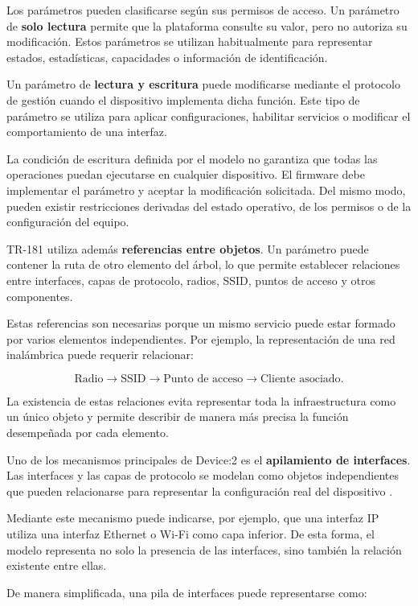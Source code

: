 Los parámetros pueden clasificarse según sus permisos de acceso. Un
parámetro de \textbf{solo lectura} permite que la plataforma consulte su
valor, pero no autoriza su modificación. Estos parámetros se utilizan
habitualmente para representar estados, estadísticas, capacidades o
información de identificación.

Un parámetro de \textbf{lectura y escritura} puede modificarse mediante
el protocolo de gestión cuando el dispositivo implementa dicha función.
Este tipo de parámetro se utiliza para aplicar configuraciones, habilitar
servicios o modificar el comportamiento de una interfaz.

La condición de escritura definida por el modelo no garantiza que todas
las operaciones puedan ejecutarse en cualquier dispositivo. El firmware
debe implementar el parámetro y aceptar la modificación solicitada. Del
mismo modo, pueden existir restricciones derivadas del estado operativo,
de los permisos o de la configuración del equipo.

TR-181 utiliza además
\textbf{referencias entre objetos}. Un parámetro puede contener la ruta
de otro elemento del árbol, lo que permite establecer relaciones entre
interfaces, capas de protocolo, radios, SSID, puntos de acceso y otros
componentes.

Estas referencias son necesarias porque un mismo servicio puede estar
formado por varios elementos independientes. Por ejemplo, la
representación de una red inalámbrica puede requerir relacionar:

\[
    \text{Radio}
    \longrightarrow
    \text{SSID}
    \longrightarrow
    \text{Punto de acceso}
    \longrightarrow
    \text{Cliente asociado}.
\]

La existencia de estas relaciones evita representar toda la
infraestructura como un único objeto y permite describir de manera más
precisa la función desempeñada por cada elemento.

Uno de los mecanismos principales de Device:2 es el
\textbf{apilamiento de interfaces}. Las interfaces y las capas de
protocolo se modelan como objetos independientes que pueden relacionarse
para representar la configuración real del dispositivo
\cite{bbf_tr181}.

Mediante este mecanismo puede indicarse, por ejemplo, que una interfaz IP
utiliza una interfaz Ethernet o Wi-Fi como capa inferior. De esta forma,
el modelo representa no solo la presencia de las interfaces, sino también
la relación existente entre ellas.

De manera simplificada, una pila de interfaces puede representarse como:

